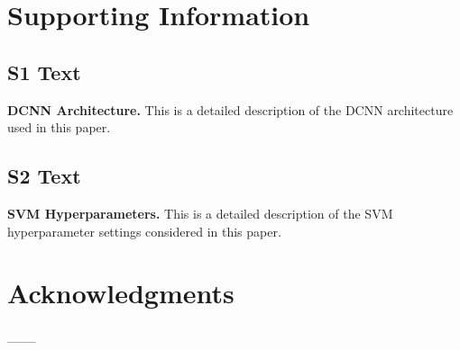 \documentclass[10pt,letterpaper]{article}
\begin{document}
\section*{Supporting Information}

\subsection*{S1 Text}
\label{S1_Text}
{\bf DCNN Architecture.}  This is a detailed description of the DCNN architecture used in this paper.

\subsection*{S2 Text}
\label{S2_Text}
{\bf SVM Hyperparameters.}  This is a detailed description of the SVM hyperparameter settings considered in this paper.

\section*{Acknowledgments}
\_\_\_

\nolinenumbers


\end{document}
